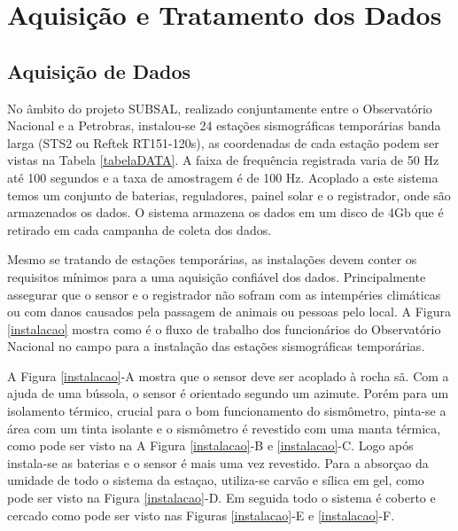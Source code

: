 \chapter{Aquisição e Tratamento dos Dados}
\section{Aquisição de Dados}

No âmbito do projeto SUBSAL, realizado conjuntamente entre o Observatório Nacional e a Petrobras,  instalou-se 24 estações sismográficas temporárias banda larga (STS2 ou Reftek RT151-120s), as coordenadas de cada estação podem ser vistas na Tabela \ref{tabelaDATA}. A faixa de frequência registrada varia de 50 Hz até 100 segundos e a taxa de amostragem é de 100 Hz. Acoplado a este sistema temos um conjunto de baterias, reguladores, painel solar e o registrador, onde são armazenados os dados. O sistema armazena os dados em um disco de 4Gb que é retirado em cada campanha de coleta dos dados.

Mesmo se tratando de estações temporárias, as instalações devem conter os requisitos mínimos para a uma aquisição confiável dos dados. Principalmente assegurar que o sensor e o registrador não sofram com as intempéries climáticas ou com danos causados pela passagem de animais ou pessoas pelo local. A Figura \ref{instalacao} mostra como é o fluxo de trabalho dos funcionários do Observatório Nacional no campo para a instalação das estações sismográficas temporárias. 

A Figura \ref{instalacao}-A mostra que o sensor deve ser acoplado à rocha sã. Com a ajuda de uma bússola, o sensor é orientado segundo um azimute.  Porém para um isolamento térmico, crucial para o bom funcionamento do sismômetro, pinta-se a área com um tinta isolante e o sismômetro é revestido com uma manta térmica, como pode ser visto na A Figura \ref{instalacao}-B e \ref{instalacao}-C. Logo após instala-se as baterias e o sensor é mais uma vez revestido. Para a absorçao da umidade de todo o sistema da estaçao, utiliza-se carvão e sílica em gel, como pode ser visto na Figura \ref{instalacao}-D. Em seguida todo o sistema é coberto e cercado como pode ser visto nas Figuras \ref{instalacao}-E e \ref{instalacao}-F.	  

